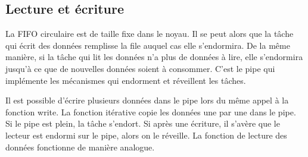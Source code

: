 \subsection{Lecture et écriture}
La FIFO circulaire est de taille fixe dans le noyau. Il se peut alors que la tâche qui écrit des données remplisse la file auquel cas elle s'endormira.
De la même manière, si la tâche qui lit les données n'a plus de données à lire, elle s'endormira jusqu'à ce que de nouvelles données soient à consommer.
C'est le pipe qui implémente les mécanismes qui endorment et réveillent les tâches.

Il est possible d'écrire plusieurs données dans le pipe lors du même appel à la fonction write. La fonction itérative copie les données une par une dans le pipe. Si le pipe est plein, la tâche s'endort. Si après une écriture, il s'avère que le lecteur est endormi sur le pipe, alors on le réveille.
La fonction de lecture des données fonctionne de manière analogue.

